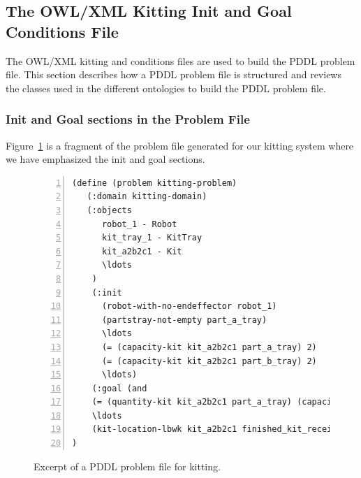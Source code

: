 \subsection{The OWL/XML Kitting Init and Goal Conditions File} \label{owlinitgoal}
The OWL/XML kitting  and  conditions files are used to build the PDDL
problem file. This section describes how a PDDL problem file is structured and 
reviews the classes used in the different ontologies to build the PDDL problem file.

\subsubsection{Init and Goal sections in the Problem File}
Figure~\ref{fig:problem} is a fragment of the problem file generated for our kitting
system where we have emphasized the init and goal sections.

\begin{figure}[t!h!]
\begin{minipage}{.7\paperwidth}
\begin{list}{}{\setlength{\leftmargin}{1em}}\item\small
\begin{Verbatim}[commandchars=\\\{\},fontsize=\scriptsize, numbers=left, numbersep=2pt]
(define (problem kitting-problem)
   (:domain kitting-domain)
   (:objects
      robot_1 - Robot
      kit_tray_1 - KitTray
      kit_a2b2c1 - Kit
      \ldots
	)
    (:init
      (robot-with-no-endeffector robot_1)
      (partstray-not-empty part_a_tray)
      \ldots
      (= (capacity-kit kit_a2b2c1 part_a_tray) 2)
      (= (capacity-kit kit_a2b2c1 part_b_tray) 2)
      \ldots)
    (:goal (and
    (= (quantity-kit kit_a2b2c1 part_a_tray) (capacity-kit kit_a2b2c1 part_a_tray))
    \ldots
    (kit-location-lbwk kit_a2b2c1 finished_kit_receiver))
)
\end{Verbatim}
\end{list}
\end{minipage}
\caption{Excerpt of a PDDL problem file for kitting.}
\label{fig:problem}
\end{figure}

